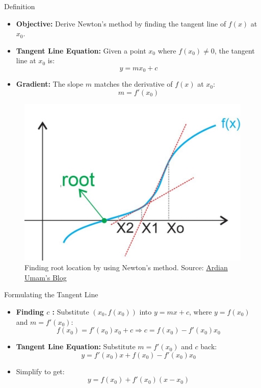\documentclass[serif, aspectratio=169]{beamer}
\begin{document}
\begin{frame}{Definition}
\begin{minipage}{0.55\linewidth}
\begin{itemize}
    \item \textbf{Objective:} Derive Newton’s method by finding the tangent line of \( f(x) \) at \( x_0 \).
    \item \textbf{Tangent Line Equation:} Given a point \( x_0 \) where \( f(x_0) \neq 0 \), the tangent line at \( x_0 \) is:
    \[
    y = mx_0 + c
    \]
    \item \textbf{Gradient:} The slope \( m \) matches the derivative of \( f(x) \) at \( x_0 \):
    \[
    m = f'(x_0)
    \]
\end{itemize}
\end{minipage}%
\begin{minipage}{0.35\linewidth}
    \begin{figure}
        \centering
        \includegraphics[width=1\linewidth]{pic/newton_raphson_ardianumam.jpg}
        \caption{\footnotesize Finding root location by using Newton’s method. Source: \href{https://ardianumam.wordpress.com}{Ardian Umam's Blog}}
    \end{figure}
\end{minipage}
\end{frame}

\begin{frame}{Formulating the Tangent Line}
\begin{itemize}
    \item \textbf{Finding \( c \) :} Substitute \( (x_0, f(x_0)) \) into \( y = mx + c \), where \( y = f(x_0) \) and \( m = f'(x_0) \):
    \[
    f(x_0) = f'(x_0)x_0 + c \Rightarrow c = f(x_0) - f'(x_0)x_0
    \]
    \item \textbf{Tangent Line Equation:} Substitute \( m = f'(x_0) \) and \( c \) back:
    \[
    y = f'(x_0)x + f(x_0) - f'(x_0)x_0
    \]
    \item Simplify to get:
    \[
    y = f(x_0) + f'(x_0)(x - x_0)
    \]
\end{itemize}
\end{frame}
\end{document}

